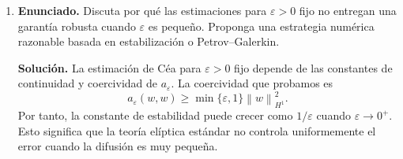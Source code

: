 \documentclass[11pt]{article}
\newcommand{\norm}[1]{\left\lVert #1\right\rVert}
\def\dx{\mbox{\(\,\mathrm{d}x\)}}
\DeclareMathOperator{\spanop}{span}
\begin{document}
\begin{enumerate}[label=\textbf{\arabic*.}, leftmargin=*]
\begin{enumerate}[label=(\alph*), leftmargin=*]
    Falta la condición de inyectividad en la variable de prueba: si $\zeta\in L^2(0,1)$ satisface
    \[
        a_0(u,\zeta)=0
        \qquad\forall u\in U,
    \]
    debemos probar que $\zeta=0$. Para ello, definimos $u\in U$ como la solución de
    \[
        u'+u=\zeta,
        \qquad
        u(0)=0.
    \]
    Explícitamente,
    \[
        u(x)=\int_0^xe^{-(x-s)}\zeta(s)\,ds.
    \]
    Esta función pertenece a $U$ y satisface $u'+u=\zeta$. Entonces
    \[
        0=a_0(u,\zeta)=\int_0^1(u'+u)\zeta\dx
        =
        \int_0^1\zeta^2\dx
        =
        \norm{\zeta}_{L^2}^2.
    \]
    Por tanto $\zeta=0$.

    Un primer par discreto malo es
    \[
        U_h=\spanop\{x,x^2\},
        \qquad
        V_h=\spanop\{1\}.
    \]
    Si $u_h=8x-9x^2$, entonces
    \[
    \begin{aligned}
        a_0(u_h,1)
        &=
        \int_0^1(u_h'+u_h)\dx
        =
        u_h(1)-u_h(0)+\int_0^1u_h\dx\\
        &=
        (-1)-0+\int_0^1(8x-9x^2)\dx
        =
        -1+4-3=0.
    \end{aligned}
    \]
    Como $u_h\ne0$ y todo $v_h\in V_h$ es múltiplo de $1$, el supremo discreto para este $u_h$ es cero.

    Un segundo par malo es
    \[
        U_h=\spanop\{x\},
        \qquad
        V_h=\spanop\left\{1-\frac95x\right\}.
    \]
    Para $u_h=x$ y $v_h=1-\frac95x$,
    \[
    \begin{aligned}
        a_0(x,v_h)
        &=
        \int_0^1(1+x)\left(1-\frac95x\right)\dx\\
        &=
        \int_0^1\left(1-\frac45x-\frac95x^2\right)\dx
        =
        1-\frac25-\frac35=0.
    \end{aligned}
    \]
    Nuevamente, una función discreta no nula queda invisible para todas las funciones de prueba discretas. Por eso el inf--sup discreto falla.

    \item \textbf{Enunciado.} Discuta por qué las estimaciones para $\varepsilon>0$ fijo no entregan una garantía robusta cuando $\varepsilon$ es pequeño. Proponga una estrategia numérica razonable basada en estabilización o Petrov--Galerkin.

    \textbf{Solución.} La estimación de Céa para $\varepsilon>0$ fijo depende de las constantes de continuidad y coercividad de $a_\varepsilon$. La coercividad que probamos es
    \[
        a_\varepsilon(w,w)
        \ge
        \min\{\varepsilon,1\}\norm{w}_{H^1}^2.
    \]
    Por tanto, la constante de estabilidad puede crecer como $1/\varepsilon$ cuando $\varepsilon\to0^+$. Esto significa que la teoría elíptica estándar no controla uniformemente el error cuando la difusión es muy pequeña.


\end{enumerate}
\end{enumerate}
\end{document}
